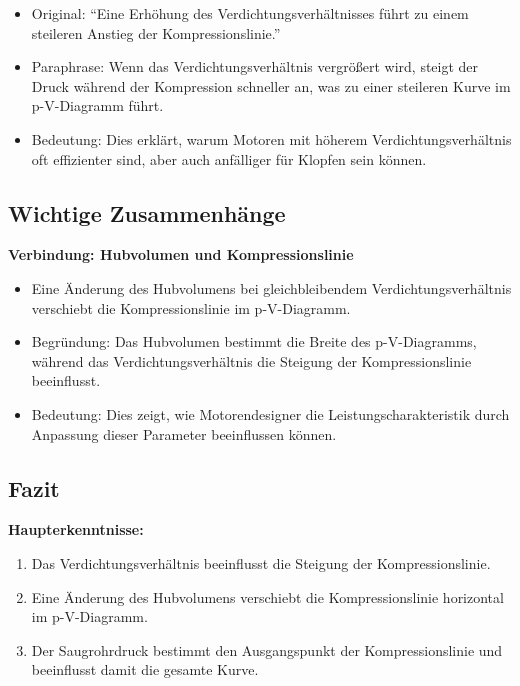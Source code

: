 \documentclass[a4paper,12pt]{article}
\begin{document}
\begin{itemize}
    \item Original: \enquote{Eine Erhöhung des Verdichtungsverhältnisses führt zu einem steileren Anstieg der Kompressionslinie.}
    \item Paraphrase: Wenn das Verdichtungsverhältnis vergrößert wird, steigt der Druck während der Kompression schneller an, was zu einer steileren Kurve im p-V-Diagramm führt.
    \item Bedeutung: Dies erklärt, warum Motoren mit höherem Verdichtungsverhältnis oft effizienter sind, aber auch anfälliger für Klopfen sein können.
\end{itemize}

\subsection{Wichtige Zusammenhänge}

\textbf{Verbindung: Hubvolumen und Kompressionslinie}

\begin{itemize}
    \item Eine Änderung des Hubvolumens bei gleichbleibendem Verdichtungsverhältnis verschiebt die Kompressionslinie im p-V-Diagramm.
    \item Begründung: Das Hubvolumen bestimmt die Breite des p-V-Diagramms, während das Verdichtungsverhältnis die Steigung der Kompressionslinie beeinflusst.
    \item Bedeutung: Dies zeigt, wie Motorendesigner die Leistungscharakteristik durch Anpassung dieser Parameter beeinflussen können.
\end{itemize}

\subsection{Fazit}

\textbf{Haupterkenntnisse:}

\begin{enumerate}
    \item Das Verdichtungsverhältnis beeinflusst die Steigung der Kompressionslinie.
    \item Eine Änderung des Hubvolumens verschiebt die Kompressionslinie horizontal im p-V-Diagramm.
    \item Der Saugrohrdruck bestimmt den Ausgangspunkt der Kompressionslinie und beeinflusst damit die gesamte Kurve.
\end{enumerate}
\end{document}
